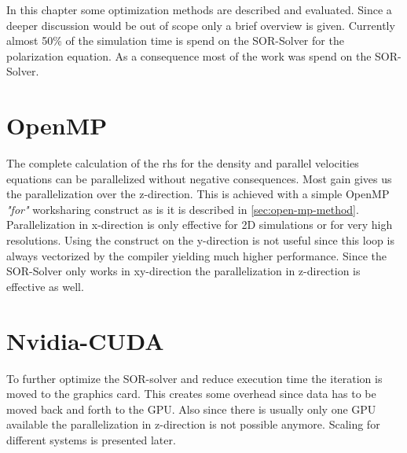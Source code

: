 \documentclass[master.tex]{subfiles}
\begin{document}
In this chapter some optimization methods are described and evaluated. Since a deeper discussion would be out of scope only a brief overview is given. Currently almost 50\% of the simulation time is spend on the SOR-Solver for the polarization equation. As a consequence most of the work was spend on the SOR-Solver.
\section{OpenMP}
The complete calculation of the \ac{rhs} for the density and parallel velocities equations can be parallelized without negative consequences. Most gain gives us the parallelization over the z-direction. This is achieved with a simple OpenMP \textit{"for"} worksharing construct as is it is described in \autoref{sec:open-mp-method}. Parallelization in x-direction is only effective for 2D simulations or for very high resolutions. Using the construct on the y-direction is not useful since this loop is always vectorized by the compiler yielding much higher performance. Since the SOR-Solver only works in xy-direction the parallelization in z-direction is effective as well.

\section{Nvidia-CUDA}
To further optimize the SOR-solver and reduce execution time the iteration is moved to the graphics card. This creates some overhead since data has to be moved back and forth to the GPU. Also since there is usually only one GPU available the parallelization in z-direction is not possible anymore. Scaling for different systems is presented later.
\end{document}
